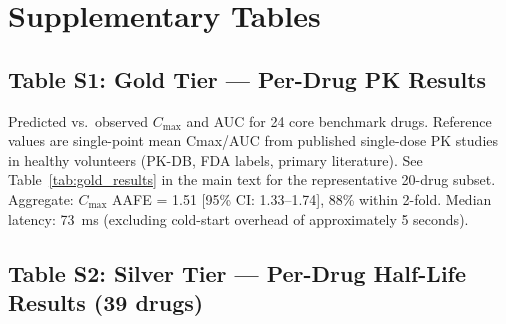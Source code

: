 \documentclass[review,3p]{elsarticle}
\begin{document}
\appendix

\section{Supplementary Tables}
\label{sec:supplementary}

\subsection*{Table S1: Gold Tier --- Per-Drug PK Results}
\label{tab:s1}

Predicted vs.\ observed $C_{\max}$ and AUC for 24 core benchmark drugs. Reference values are single-point mean Cmax/AUC from published single-dose PK studies in healthy volunteers (PK-DB, FDA labels, primary literature). See Table~\ref{tab:gold_results} in the main text for the representative 20-drug subset. Aggregate: $C_{\max}$ AAFE = 1.51 [95\% CI: 1.33--1.74], 88\% within 2-fold. Median latency: \SI{73}{ms} (excluding cold-start overhead of approximately 5 seconds).

\subsection*{Table S2: Silver Tier --- Per-Drug Half-Life Results (39 drugs)}
\label{tab:s2}
\end{document}
